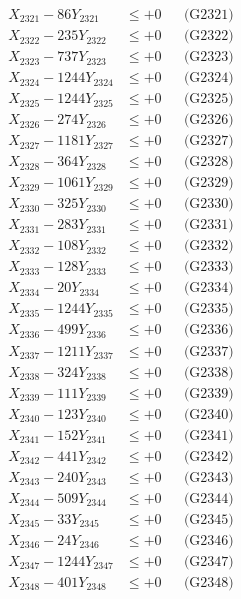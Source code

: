 \documentclass[a4paper,10pt]{article}
\begin{document}
{\begin{align}
\allowbreak
X_{2321} - 86Y_{2321} &\leq +0 && \text{(G2321)} \\
X_{2322} - 235Y_{2322} &\leq +0 && \text{(G2322)} \\
X_{2323} - 737Y_{2323} &\leq +0 && \text{(G2323)} \\
X_{2324} - 1244Y_{2324} &\leq +0 && \text{(G2324)} \\
X_{2325} - 1244Y_{2325} &\leq +0 && \text{(G2325)} \\
X_{2326} - 274Y_{2326} &\leq +0 && \text{(G2326)} \\
X_{2327} - 1181Y_{2327} &\leq +0 && \text{(G2327)} \\
X_{2328} - 364Y_{2328} &\leq +0 && \text{(G2328)} \\
X_{2329} - 1061Y_{2329} &\leq +0 && \text{(G2329)} \\
X_{2330} - 325Y_{2330} &\leq +0 && \text{(G2330)} \\
\allowbreak
X_{2331} - 283Y_{2331} &\leq +0 && \text{(G2331)} \\
X_{2332} - 108Y_{2332} &\leq +0 && \text{(G2332)} \\
X_{2333} - 128Y_{2333} &\leq +0 && \text{(G2333)} \\
X_{2334} - 20Y_{2334} &\leq +0 && \text{(G2334)} \\
X_{2335} - 1244Y_{2335} &\leq +0 && \text{(G2335)} \\
X_{2336} - 499Y_{2336} &\leq +0 && \text{(G2336)} \\
X_{2337} - 1211Y_{2337} &\leq +0 && \text{(G2337)} \\
X_{2338} - 324Y_{2338} &\leq +0 && \text{(G2338)} \\
X_{2339} - 111Y_{2339} &\leq +0 && \text{(G2339)} \\
X_{2340} - 123Y_{2340} &\leq +0 && \text{(G2340)} \\
\allowbreak
X_{2341} - 152Y_{2341} &\leq +0 && \text{(G2341)} \\
X_{2342} - 441Y_{2342} &\leq +0 && \text{(G2342)} \\
X_{2343} - 240Y_{2343} &\leq +0 && \text{(G2343)} \\
X_{2344} - 509Y_{2344} &\leq +0 && \text{(G2344)} \\
X_{2345} - 33Y_{2345} &\leq +0 && \text{(G2345)} \\
X_{2346} - 24Y_{2346} &\leq +0 && \text{(G2346)} \\
X_{2347} - 1244Y_{2347} &\leq +0 && \text{(G2347)} \\
X_{2348} - 401Y_{2348} &\leq +0 && \text{(G2348)} \\

\end{align}}
\end{document}
